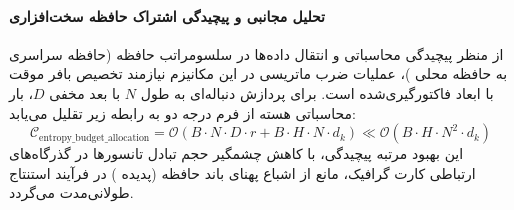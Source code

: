 \paragraph{تحلیل مجانبی و پیچیدگی اشتراک حافظه سخت‌افزاری}
از منظر پیچیدگی محاسباتی و انتقال داده‌ها در سلسومراتب حافظه (حافظه سراسری  به حافظه محلی )، عملیات ضرب ماتریسی در این مکانیزم نیازمند تخصیص بافر موقت با ابعاد فاکتورگیری‌شده است. برای پردازش دنباله‌ای به طول $N$ با بعد مخفی $D$، بار محاسباتی هسته از فرم درجه دو به رابطه زیر تقلیل می‌یابد:
\begin{equation}
\label{eq:complexity_entropy_budget_allocation}
\mathcal{C}_{\text{entropy\_budget\_allocation}} = \mathcal{O}\left( B \cdot N \cdot D \cdot r + B \cdot H \cdot N \cdot d_k \right) \ll \mathcal{O}\left( B \cdot H \cdot N^2 \cdot d_k \right)
\end{equation}
این بهبود مرتبه پیچیدگی، با کاهش چشمگیر حجم تبادل تانسورها در گذرگاه‌های ارتباطی کارت گرافیک، مانع از اشباع پهنای باند حافظه (پدیده ) در فرآیند استنتاج طولانی‌مدت می‌گردد.
